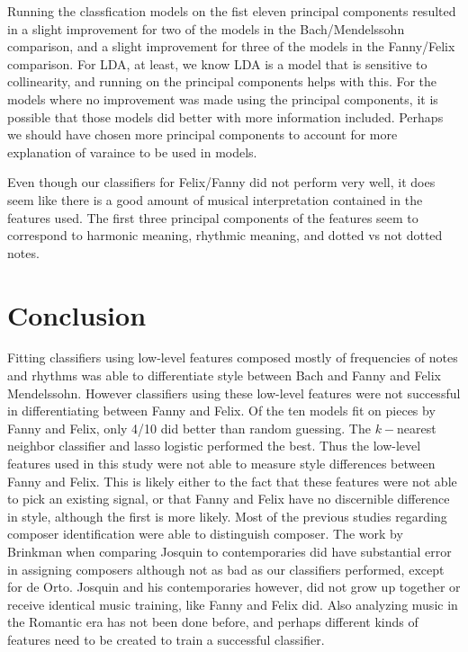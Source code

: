 \documentclass[12pt,twoside]{reedthesis}
\theoremstyle{definition}
\theoremstyle{definition}
\theoremstyle{definition}
\theoremstyle{remark}
\begin{document}
Running the classfication models on the fist eleven principal components
resulted in a slight improvement for two of the models in the
Bach/Mendelssohn comparison, and a slight improvement for three of the
models in the Fanny/Felix comparison. For LDA, at least, we know LDA is
a model that is sensitive to collinearity, and running on the principal
components helps with this. For the models where no improvement was made
using the principal components, it is possible that those models did
better with more information included. Perhaps we should have chosen
more principal components to account for more explanation of varaince to
be used in models.

Even though our classifiers for Felix/Fanny did not perform very well,
it does seem like there is a good amount of musical interpretation
contained in the features used. The first three principal components of
the features seem to correspond to harmonic meaning, rhythmic meaning,
and dotted vs not dotted notes.

\chapter*{Conclusion}\label{conclusion}

Fitting classifiers using low-level features composed mostly of
frequencies of notes and rhythms was able to differentiate style between
Bach and Fanny and Felix Mendelssohn. However classifiers using these
low-level features were not successful in differentiating between Fanny
and Felix. Of the ten models fit on pieces by Fanny and Felix, only 4/10
did better than random guessing. The \(k-\)nearest neighbor classifier
and lasso logistic performed the best. Thus the low-level features used
in this study were not able to measure style differences between Fanny
and Felix. This is likely either to the fact that these features were
not able to pick an existing signal, or that Fanny and Felix have no
discernible difference in style, although the first is more likely. Most
of the previous studies regarding composer identification were able to
distinguish composer. The work by Brinkman when comparing Josquin to
contemporaries did have substantial error in assigning composers
although not as bad as our classifiers performed, except for de Orto.
Josquin and his contemporaries however, did not grow up together or
receive identical music training, like Fanny and Felix did. Also
analyzing music in the Romantic era has not been done before, and
perhaps different kinds of features need to be created to train a
successful classifier.
\end{document}
